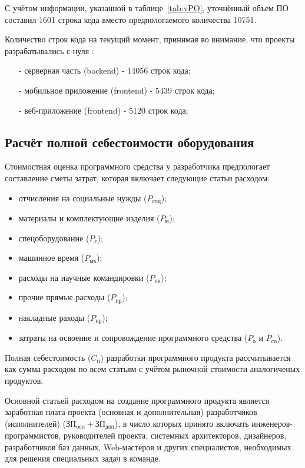 С учётом информации, указанной в таблице~\ref{tab:vPO}, уточнённый объем ПО составил 1601 строка кода
вместо предпологаемого количества 10751.

Количество строк кода на текущий момент, принимая во внимание, что проекты разрабатывались с нуля \cite{LinuxCloc}:
\begin{enumerate}
    \item[-] серверная часть (backend) - 14056 строк кода;
    \item[-] мобильное приложение (frontend) - 5439 строк кода;
    \item[-] веб-приложение (frontend) - 5120 строк кода;
\end{enumerate}

\subsection{Расчёт полной себестоимости оборудования}

Стоимостная оценка программного средства у разработчика предпологает составление сметы затрат,
которая включает следующие статьи расходом:

\begin{itemize}
    \item отчисления на социальные нужды ($P_{\text{соц}}$);
    \item материалы и комплектующие изделия ($P_{\text{м}}$);
    \item спецоборудование ($P_{\text{с}}$);
    \item машинное время ($P_{\text{мв}}$);
    \item расходы на научные командировки ($P_{\text{нк}}$);
    \item прочие прямые расходы ($P_{\text{пр}}$);
    \item накладные раходы ($P_{\text{нр}}$);
    \item затраты на освоение и сопровождение программного средства ($P_{\text{о}}$ и $P_{\text{со}}$).
\end{itemize}

Полная себестоимость ($C_{\text{п}}$) разработки программного продукта рассчитывается как сумма расходом
по всем статьям с учётом рыночной стоимости аналогиченых продуктов.

Основной статьей расходом на создание программного продукта является заработная плата проекта
(основная и дополнительная) разработчиков (исполнителей)
($\text{ЗП}_{\text{осн}} + \text{ЗП}_{\text{доп}}$),
в число которых принято включать инженеров-программистов,
руководителей проекта, системных архитекторов, дизайнеров, разработчиков баз данных,
Web-мастеров и других специалистов, необходимых для решения специальных задач в команде.

